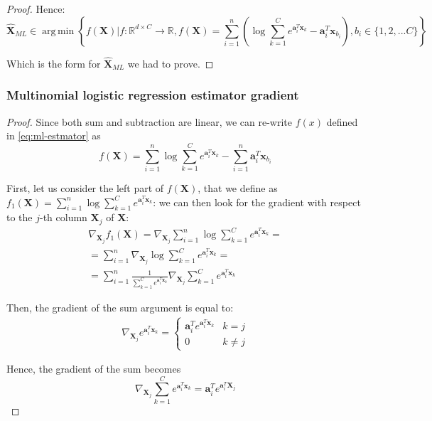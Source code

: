 \documentclass[12pt]{article}
\DeclareMathOperator*{\argmin}{arg\,min}
\newcommand{\expaxsum}{\sum_{k=1}^{C} e^{\mathbf{a}_{i}^T\mathbf{x}_k}}
\newcommand{\boldX}{\mathbf{X}}
\begin{document}
\begin{proof}
Hence:
\begin{equation} \label{eq:ml-estmator}
    \hat{\boldX}_{ML} \in \argmin \left \{ f(\boldX) | f: \mathbb{R}^{d \times C} \rightarrow \mathbb{R}, f(\boldX) = \sum_{i=1}^n \left (\log \expaxsum - \mathbf{a}_{i}^T\mathbf{x}_{b_{i}} \right ), b_{i} \in \{1, 2, ... C\} \right \}
\end{equation}

Which is the form for $\hat{\boldX}_{ML}$ we had to prove.
\end{proof}

\subsubsection{Multinomial logistic regression estimator gradient}
\begin{proof}
Since both sum and subtraction are linear, we can re-write $f(x)$ defined in \eqref{eq:ml-estmator} as
\begin{equation}
    f(\boldX) = \sum_{i=1}^n \log \expaxsum - \sum_{i=1}^n \mathbf{a}_{i}^T\mathbf{x}_{b_{i}}
\end{equation}

First, let us consider the left part of $f(\boldX)$, that we define as $f_1(\boldX) = \sum_{i=1}^n \log \expaxsum$: we can then look for the gradient with respect to the $j$-th column $\boldX_j$ of $\boldX$:
\begin{gather} \label{eq:gradient-f1-sum}
    \nabla_{\boldX_j} f_1(\boldX) = \nabla_{\boldX_j} \sum_{i=1}^n \log \expaxsum = \\
    = \sum_{i=1}^n \nabla_{\boldX_j} \log \expaxsum = \\
    =  \sum_{i=1}^n \frac{1}{\expaxsum} \nabla_{\boldX_j} \expaxsum \label{eq:fourteen}
\end{gather}

Then, the gradient of the sum argument is equal to:
\begin{gather}
    \nabla_{\boldX_j} e^{\mathbf{a}_{i}^T\mathbf{x}_k}  = \begin{cases}
    \mathbf{a}_i^T e^{\mathbf{a}_i^T \mathbf{x}_k}  & k = j \\
    0                                               & k \neq j
    \end{cases}
\end{gather}

Hence, the gradient of the sum becomes
\begin{equation}
    \nabla_{\boldX_j} \expaxsum = \mathbf{a}_i^T e^{\mathbf{a}_i^T \mathbf{X}_j}
\end{equation}


\end{proof}
\end{document}
